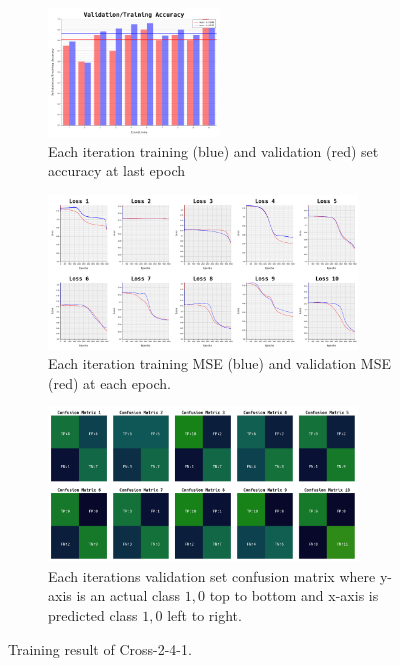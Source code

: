 \documentclass{article}
\begin{document}
\begin{figure}[ht]
	\begin{subfigure}{\textwidth}
		\centering
		\includegraphics[width=0.5\textwidth]{cross-2-4-1_3/acc}
		\caption{Each iteration training (blue) and validation (red) set accuracy at last epoch}
	\end{subfigure}
	\begin{subfigure}{\textwidth}
		\centering
		\includegraphics[width=0.9\textwidth]{cross-2-4-1_3/loss}
		\caption{Each iteration training MSE (blue) and validation MSE (red) at each epoch.}
	\end{subfigure}
	\begin{subfigure}{\textwidth}
		\centering
		\includegraphics[width=0.9\textwidth]{cross-2-4-1_3/confusion_matrix}
		\caption{Each iterations validation set confusion matrix where y-axis is an actual class $1, 0$ top to bottom and x-axis is predicted class $1, 0$ left to right.}
	\end{subfigure}
	\caption{Training result of Cross-2-4-1.}
	\label{fig:9}
\end{figure}
\FloatBarrier
\end{document}
